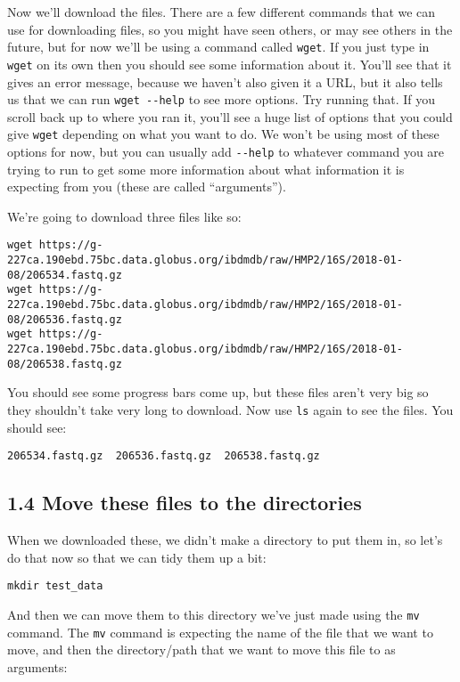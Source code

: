 \documentclass[
]{book}
\begin{document}
Now we'll download the files. There are a few different commands that we can use for downloading files, so you might have seen others, or may see others in the future, but for now we'll be using a command called \texttt{wget}. If you just type in \texttt{wget} on its own then you should see some information about it. You'll see that it gives an error message, because we haven't also given it a URL, but it also tells us that we can run \texttt{wget\ -\/-help} to see more options. Try running that. If you scroll back up to where you ran it, you'll see a huge list of options that you could give \texttt{wget} depending on what you want to do. We won't be using most of these options for now, but you can usually add \texttt{-\/-help} to whatever command you are trying to run to get some more information about what information it is expecting from you (these are called ``arguments'').

We're going to download three files like so:

\begin{verbatim}
wget https://g-227ca.190ebd.75bc.data.globus.org/ibdmdb/raw/HMP2/16S/2018-01-08/206534.fastq.gz
wget https://g-227ca.190ebd.75bc.data.globus.org/ibdmdb/raw/HMP2/16S/2018-01-08/206536.fastq.gz
wget https://g-227ca.190ebd.75bc.data.globus.org/ibdmdb/raw/HMP2/16S/2018-01-08/206538.fastq.gz
\end{verbatim}

You should see some progress bars come up, but these files aren't very big so they shouldn't take very long to download. Now use \texttt{ls} again to see the files. You should see:

\begin{verbatim}
206534.fastq.gz  206536.fastq.gz  206538.fastq.gz
\end{verbatim}

\subsection{1.4 Move these files to the directories}\label{move-these-files-to-the-directories}

When we downloaded these, we didn't make a directory to put them in, so let's do that now so that we can tidy them up a bit:

\begin{verbatim}
mkdir test_data
\end{verbatim}

And then we can move them to this directory we've just made using the \texttt{mv} command. The \texttt{mv} command is expecting the name of the file that we want to move, and then the directory/path that we want to move this file to as arguments:
\end{document}
